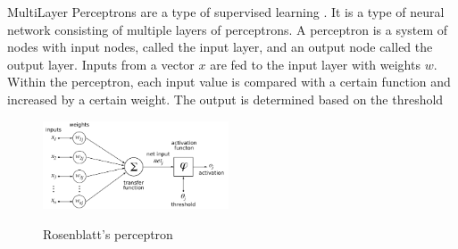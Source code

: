 \hspace{0.5cm} MultiLayer Perceptrons are a type of supervised learning \cite{michie1994machine}. It is a type of neural network consisting of multiple layers of perceptrons. A perceptron is a system of nodes with input nodes, called the input layer, and an output node called the output layer. Inputs from a vector $x$ are fed to the input layer with weights $w$. Within the perceptron, each input value is compared with a certain function and increased by a certain weight. The output is determined based on the threshold
\begin{figure}[h!]
  \caption{Rosenblatt's perceptron}
  \centering
    \includegraphics[width=55mm]{./img/perceptron.png}
    \label{fig:perceptron}
\end{figure}
